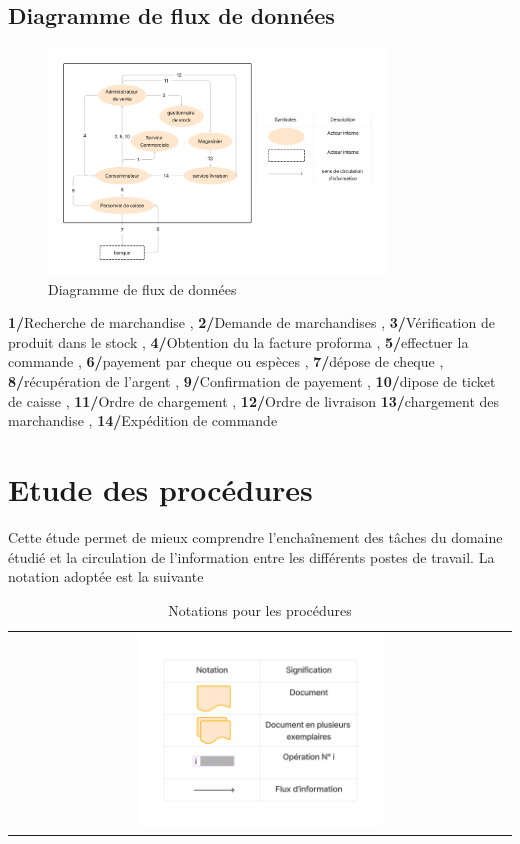 \documentclass[edit,12pt,a4paper,ChapStyle,oneside,doubleinterligne]{report}
\begin{document}
\subsection{Diagramme de flux de données}
\begin{figure}[h!]\label{fig:flux}
\centering
\includegraphics[width=0.8\textwidth]{images/Diagramme de flux.png}
\caption{Diagramme de flux de données}
\end{figure}
\textbf{1/}Recherche de marchandise , \textbf{2/}Demande de marchandises , \textbf{3/}Vérification de produit dans le stock , 
\textbf{4/}Obtention du la facture proforma , \textbf{5/}effectuer la commande , \textbf{6/}payement par cheque ou espèces
 , \textbf{7/}dépose de cheque , \textbf{8/}récupération de l’argent , \textbf{9/}Confirmation de payement
  , \textbf{10/}dipose de ticket de caisse , \textbf{11/}Ordre de chargement , \textbf{12/}Ordre de livraison
 \textbf{13/}chargement des marchandise , \textbf{14/}Expédition de commande

\section{Etude des procédures}
Cette étude permet de mieux comprendre l’enchaînement des tâches du domaine étudié et la circulation de l’information entre les différents postes de travail.
\newline La notation adoptée est la suivante
\begin{table}[h!]
    \centering
    \begin{tabular}{c}
        \centering
        \includegraphics[width=0.5\textwidth]{images/description procedures.png}
    \end{tabular}
    \caption{Notations pour les procédures}
    \label{tab:Notations pour les procédures}
\end{table}
\end{document}
